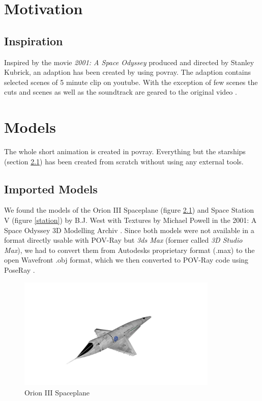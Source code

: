 
\chapter{Motivation}
\section{Inspiration}
Inspired by the movie \textit{2001: A Space Odyssey} produced and directed by Stanley Kubrick, an adaption has been created by using povray. The adaption contains selected scenes of 5 minute clip on youtube.  With the exception of few scenes the cuts and scenes as well as the soundtrack are geared to the original video \cite{EbClectic}.

\chapter{Models}
The whole short animation is created in povray. Everything but the starships (section \ref{imported_models}) has been created from scratch without using any external tools.

\section{Imported Models} \label{imported_models}

We found the models of the Orion III Spaceplane (figure \ref{orion}) and Space Station V (figure \ref{station}) by B.J. West with Textures by Michael Powell in the 2001: A Space Odyssey 3D Modelling Archiv \cite{Archive}.
Since both models were not available in a format directly usable with POV-Ray but \textit{3ds Max} (former called \textit{3D Studio Max}), we had to convert them from Autodesks proprietary format (.max) to the open Wavefront .obj format, which we then converted to POV-Ray code using PoseRay \cite{PoseRay}.

\begin{figure}[ht]
	\centering
	\includegraphics[width=0.85\textwidth]{images/orion.jpg}
	\caption{Orion III Spaceplane}
	\label{orion}
\end{figure}

